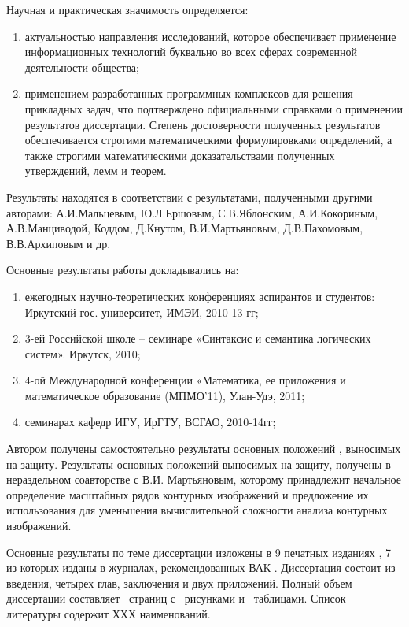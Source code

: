\noindent
Научная и практическая значимость определяется:
\begin{enumerate}
\item актуальностью направления исследований, которое обеспечивает применение информационных технологий буквально во всех сферах современной деятельности общества;
\item применением разработанных программных комплексов для решения прикладных задач, что подтверждено официальными справками о применении результатов диссертации.
Степень достоверности полученных результатов обеспечивается строгими математическими формулировками определений, а также строгими математическими доказательствами полученных утверждений, лемм и теорем.
\end{enumerate}
Результаты находятся в соответствии с результатами, полученными другими авторами: А.И.Мальцевым, Ю.Л.Ершовым, С.В.Яблонским, А.И.Кокориным, А.В.Манциводой,  Коддом, Д.Кнутом, В.И.Мартьяновым, Д.В.Пахомовым, В.В.Архиповым и др.


\noindent
Основные результаты работы докладывались на: 
\begin{enumerate}
	\item ежегодных научно-теоретических конференциях аспирантов и студентов:  Иркутский  гос. университет, ИМЭИ, 2010-13 гг;
	\item 3-ей Российской школе – семинаре «Синтаксис и семантика логических систем». Иркутск, 2010;
	\item 4-ой Международной конференции «Математика, ее приложения и математическое образование (МПМО’11),  Улан-Удэ, 2011;
	\item семинарах кафедр ИГУ, ИрГТУ, ВСГАО, 2010-14гг;
\end{enumerate}

Автором получены самостоятельно результаты основных положений \cite{A1,A2,A3,A4,A5,A6,A7,A8,A9},  выносимых  на защиту.  Результаты основных положений \cite{A3,A4,A5}  выносимых  на защиту, получены в нераздельном соавторстве с В.И. Мартьяновым, которому принадлежит начальное определение масштабных рядов контурных изображений и предложение их использования для уменьшения вычислительной сложности анализа контурных изображений.

Основные результаты по теме диссертации изложены в 9 печатных изданиях \cite{A1,A2,A3,A4,A5,A6,A7,A8,A9}, 7 из которых изданы в журналах, рекомендованных ВАК \cite{A3,A5,A6,A7,A8,A9}. Диссертация состоит из введения, четырех глав, заключения и двух приложений. Полный объем диссертации составляет \pageref{LastPage}\ страниц с \totalfigures\ рисунками и \totaltables\ таблицами. Список литературы содержит ХХХ наименований.
\clearpage